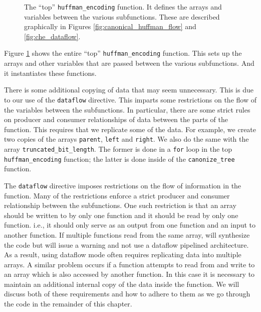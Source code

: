 \begin{figure}

\end{figure}
\begin{figure}

\caption{  The ``top'' \lstinline{huffman_encoding} function. It defines the arrays and variables  between the various subfunctions.  These are described graphically in Figures \ref{fig:canonical_huffman_flow} and \ref{fig:che_dataflow}.  }
\label{fig:huffman_encoding.cpp}
\end{figure}

Figure \ref{fig:huffman_encoding.cpp} shows the entire ``top'' \lstinline{huffman_encoding} function. This sets up the arrays and other variables that are passed between the various subfunctions. And it instantiates these functions. 

There is some additional copying of data that may seem unnecessary. This is due to our use of the \lstinline{dataflow} directive. This imparts some restrictions on the flow of the variables between the subfunctions. In particular, there are some strict rules on producer and consumer relationships of data between the parts of the function. This requires that we replicate some of the data. For example, we create two copies of the arrays \lstinline{parent}, \lstinline{left} and \lstinline{right}. We also do the same with the array \lstinline{truncated_bit_length}. The former is done in a \lstinline{for} loop in the top \lstinline{huffman_encoding} function; the latter is done inside of the \lstinline{canonize_tree} function.

\begin{aside}
The \lstinline{dataflow} directive imposes restrictions on the flow of information in the function. Many of the restrictions enforce a strict producer and consumer relationship between the subfunctions.  One such restriction is that an array should be written to by only one function and it should be read by only one function. i.e., it should only serve as an output from one function and an input to another function. If multiple functions read from the same array, \VHLS will synthesize the code but will issue a warning and not use a dataflow pipelined architecture.  As a result, using dataflow mode often requires replicating data into multiple arrays. A similar problem occurs if a function attempts to read from and write to an array which is also accessed by another function.  In this case it is necessary to maintain an additional internal copy of the data inside the function.  We will discuss both of these requirements and how to adhere to them as we go through the code in the remainder of this chapter.
\end{aside}

